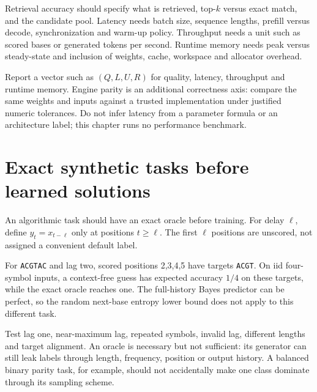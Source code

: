
Retrieval accuracy should specify what is retrieved, top-$k$ versus exact match, and the candidate pool. Latency needs batch size, sequence lengths, prefill versus decode, synchronization and warm-up policy. Throughput needs a unit such as scored bases or generated tokens per second. Runtime memory needs peak versus steady-state and inclusion of weights, cache, workspace and allocator overhead.

Report a vector such as $(Q,L,U,R)$ for quality, latency, throughput and runtime memory. Engine parity is an additional correctness axis: compare the same weights and inputs against a trusted implementation under justified numeric tolerances. Do not infer latency from a parameter formula or an architecture label; this chapter runs no performance benchmark.

\section{Exact synthetic tasks before learned solutions}
An algorithmic task should have an exact oracle before training. For delay $\ell$, define $y_t=x_{t-\ell}$ only at positions $t\ge\ell$. The first $\ell$ positions are unscored, not assigned a convenient default label.


For \texttt{ACGTAC} and lag two, scored positions 2,3,4,5 have targets \texttt{ACGT}. On iid four-symbol inputs, a context-free guess has expected accuracy $1/4$ on these targets, while the exact oracle reaches one. The full-history Bayes predictor can be perfect, so the random next-base entropy lower bound does not apply to this different task.

Test lag one, near-maximum lag, repeated symbols, invalid lag, different lengths and target alignment. An oracle is necessary but not sufficient: its generator can still leak labels through length, frequency, position or output history. A balanced binary parity task, for example, should not accidentally make one class dominate through its sampling scheme.

